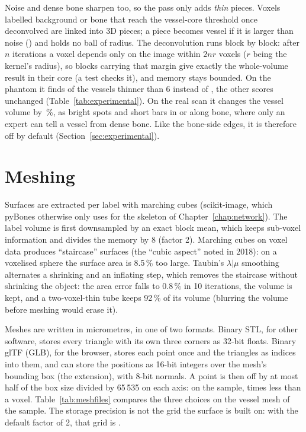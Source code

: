 Noise and dense bone sharpen too, so the pass only adds \emph{thin} pieces. Voxels labelled background
or bone that reach the vessel-core threshold once deconvolved are linked into 3D pieces; a piece
becomes vessel if it is larger than noise (\pbValueExpThinMinVolume\umcube) and holds no ball of
\pbValueExpThinMaxHalf\um{} radius. The deconvolution runs block by block: after $n$ iterations a
voxel depends only on the image within $2nr$ voxels ($r$ being the kernel's radius), so blocks
carrying that margin give exactly the whole-volume result in their core (a test checks it), and memory
stays bounded. On the phantom it finds \pbValueExpThinThinRecall{} of the vessels thinner than 6\um{}
instead of \pbValueExpDefaultThinRecall, the other scores unchanged (Table~\ref{tab:experimental}). On
the real scan it changes the vessel volume by \pbValueExpRealThinVesselPct\,\%, as bright spots and short bars in
or along bone, where only an expert can tell a vessel from dense bone. Like the bone-side edges, it
is therefore off by default (Section~\ref{sec:experimental}).

\section{Meshing}
\label{sec:meshing}

Surfaces are extracted per label with marching cubes (scikit-image, which pyBones otherwise only uses
for the skeleton of Chapter~\ref{chap:network}).
The label volume is first downsampled by an exact block mean, which keeps sub-voxel information and
divides the memory by $8$ (factor 2). Marching cubes on voxel data produces ``staircase'' surfaces
(the ``cubic aspect'' noted in 2018): on a voxelised sphere the surface area is 8.5\,\% too large.
Taubin's $\lambda|\mu$ smoothing alternates a shrinking and an inflating step, which removes the
staircase without shrinking the object: the area error falls to 0.8\,\% in 10 iterations, the volume
is kept, and a two-voxel-thin tube keeps 92\,\% of its volume (blurring the volume before meshing would
erase it).

Meshes are written in micrometres, in one of two formats. Binary STL, for other software, stores every
triangle with its own three corners as 32-bit floats. Binary glTF (GLB), for the browser, stores each
point once and the triangles as indices into them, and can store the positions as 16-bit integers over
the mesh's bounding box (the  extension), with 8-bit normals. A point is
then off by at most half of the box size divided by 65\,535 on each axis: \pbValueMeshErrorUm\um{}
on the sample, \pbValueMeshErrorVoxelRatio{} times less than a voxel. Table~\ref{tab:meshfiles}
compares the three choices on the vessel mesh of the sample. The storage precision is not the grid the
surface is built on: with the default factor of 2, that grid is \pbValueMeshGridUm\um{}.

